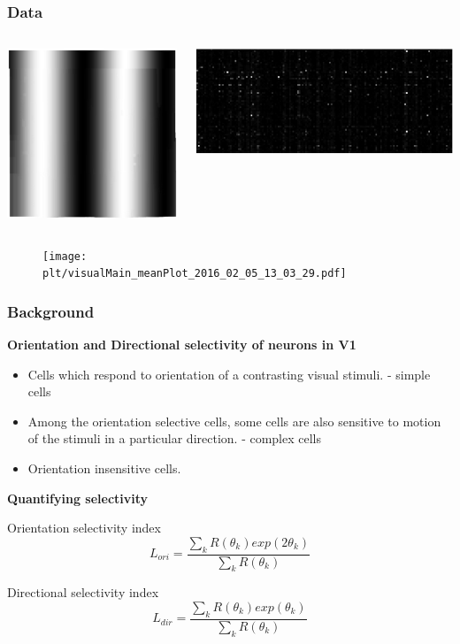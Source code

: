 \documentclass{beamer}
\newcommand{\plt}{../../plots}
\begin{document}
\begin{frame}
\frametitle{Data}

\begin{columns}[c]
\begin{center}
    \href{run:img/sin.mp4}{
    \includegraphics[width=0.5\linewidth]
    {img/grating_c.png}}
\end{center}
\begin{center}
    \href{run:img/ani.mp4}{
    \includegraphics[width=0.5\linewidth]
    {img/resp_c.png}}
\end{center}
\end{columns}
\begin{figure}
\texttt{[image: \\plt/visualMain\_meanPlot\_2016\_02\_05\_13\_03\_29.pdf]}
\end{figure}
\end{frame}

\begin{frame}
\frametitle{Background}
\textbf{Orientation and Directional selectivity of neurons in V1}
\begin{itemize}
    \item Cells which respond to orientation of a contrasting visual stimuli. - simple cells
    \item Among the orientation selective cells, some cells are also sensitive to motion of the stimuli in a particular direction. - complex cells
    \item Orientation insensitive cells.
\end{itemize}
\textbf{Quantifying selectivity}
\begin{block}{Orientation selectivity index}
$$L_{ori} = \frac{\sum_{k} R(\theta_k) exp(2\theta_k)}{\sum_{k} R(\theta_k)}$$
\end{block}
\begin{block}{Directional selectivity index}
$$L_{dir} = \frac{\sum_{k} R(\theta_k) exp(\theta_k)}{\sum_{k} R(\theta_k)}$$
\end{block}
\end{frame}
\end{document}

